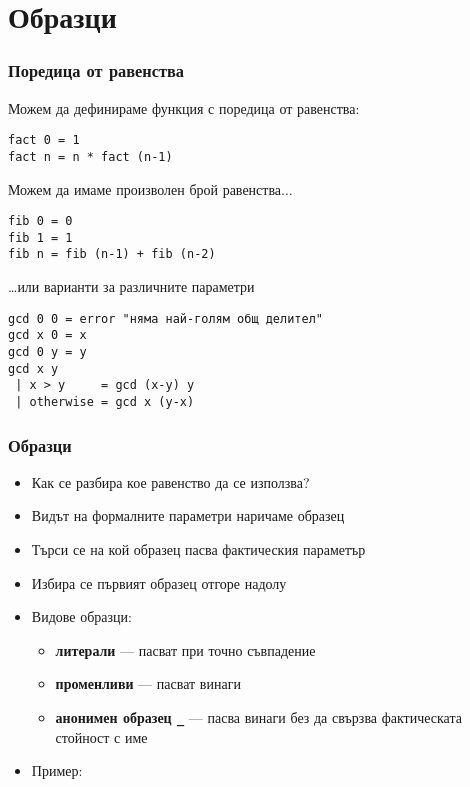 \documentclass{beamer}
\begin{document}
\section{Образци}

\begin{frame}[fragile]
  \frametitle{Поредица от равенства}
  Можем да дефинираме функция с поредица от равенства:
\begin{verbatim}
fact 0 = 1
fact n = n * fact (n-1)
\end{verbatim}
  \pause
  Можем да имаме произволен брой равенства...
\begin{verbatim}
fib 0 = 0
fib 1 = 1
fib n = fib (n-1) + fib (n-2)
\end{verbatim}
  \pause
  \ldots или варианти за различните параметри
\begin{verbatim}
gcd 0 0 = error "няма най-голям общ делител"
gcd x 0 = x
gcd 0 y = y
gcd x y
 | x > y     = gcd (x-y) y
 | otherwise = gcd x (y-x)
\end{verbatim}
\end{frame}

\begin{frame}[fragile]
  \frametitle{Образци}
  \begin{itemize}[<+->]
  \item Как се разбира кое равенство да се използва?
  \item Видът на формалните параметри наричаме \alert{образец}
  \item Търси се на кой образец пасва фактическия параметър
  \item Избира се първият образец \alert{отгоре надолу}
  \item Видове образци:
    \begin{itemize}
    \item \textbf{литерали} --- пасват при точно съвпадение
    \item \textbf{променливи} --- пасват винаги
    \item \textbf{анонимен образец \tt\_} ---  пасва винаги без да свързва фактическата стойност с име
    \end{itemize}
  \item Пример:
\begin{semiverbatim}
\end{semiverbatim}
  \end{itemize}
\end{frame}
\end{document}
